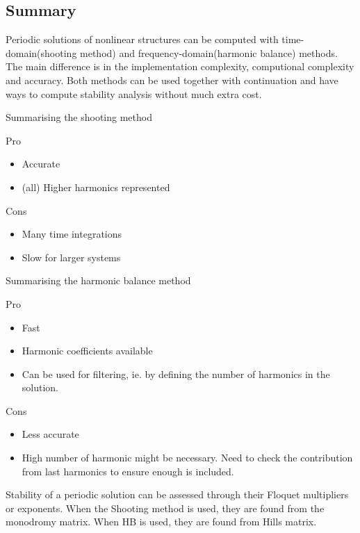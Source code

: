 \subsection{Summary}
\label{sec:per_summary}

Periodic solutions of nonlinear structures can be computed with
time-domain(shooting method) and frequency-domain(harmonic balance) methods. The
main difference is in the implementation complexity, computional complexity and
accuracy. Both methods can be used together with continuation and have ways to compute
stability analysis without much extra cost.

Summarising the shooting method
\begin{multicols}{2}
  Pro
  \begin{itemize}
  \item Accurate
  \item (all) Higher harmonics represented
  \end{itemize}
  \columnbreak
  Cons
  \begin{itemize}
  \item Many time integrations
  \item Slow for larger systems
  \end{itemize}
\end{multicols}


Summarising the harmonic balance method
\begin{multicols}{2}
  Pro
  \begin{itemize}
  \item Fast
  \item Harmonic coefficients available
  \item Can be used for filtering, ie. by defining the number of harmonics in
    the solution.
  \end{itemize}
  \vfill\null
  \columnbreak
  Cons
  \begin{itemize}
  \item Less accurate
  \item High number of harmonic might be necessary. Need to check the
    contribution from last harmonics to ensure enough is included.
  \end{itemize}
\end{multicols}


Stability of a periodic solution can be assessed through  their Floquet
multipliers or exponents. When the Shooting method is used, they are found from
the monodromy matrix. When HB is used, they are found from Hills matrix.


